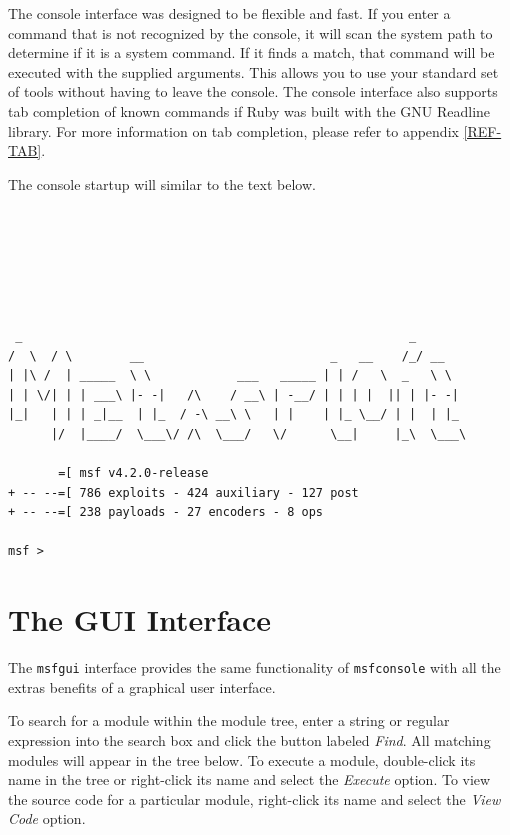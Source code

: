 \documentclass{report}
\begin{document}
\par
The console interface was designed to be flexible and fast. If you enter a
command that is not recognized by the console, it will scan the system path to
determine if it is a system command. If it finds a match, that command will be
executed with the supplied arguments. This allows you to use your standard set
of tools without having to leave the console. The console interface also
supports tab completion of known commands if Ruby was built with the GNU
Readline library. For more information on tab completion, please refer to
appendix \ref{REF-TAB}.

\par
The console startup will similar to the text below.

\begin{verbatim}






 _                                                      _
/  \  / \        __                          _   __    /_/ __
| |\ /  | _____  \ \            ___   _____ | | /   \  _   \ \
| | \/| | | ___\ |- -|   /\    / __\ | -__/ | | | |  || | |- -|
|_|   | | | _|__  | |_  / -\ __\ \   | |    | |_ \__/ | |  | |_
      |/  |____/  \___\/ /\  \___/   \/      \__|     |_\  \___\

       =[ msf v4.2.0-release
+ -- --=[ 786 exploits - 424 auxiliary - 127 post
+ -- --=[ 238 payloads - 27 encoders - 8 ops

msf >
\end{verbatim}

    \section{The GUI Interface}
    \label{STARTED-GUI}

\par
The \texttt{msfgui} interface provides the same functionality of
\texttt{msfconsole} with all the extras benefits of a graphical user interface.

\par
To search for a module within the module tree, enter a string or regular
expression into the search box and click the button labeled \textit{Find}. All
matching modules will appear in the tree below. To execute a module,
double-click its name in the tree or right-click its name and select the
\textit{Execute} option. To view the source code for a particular module,
right-click its name and select the \textit{View Code} option.
\end{document}
